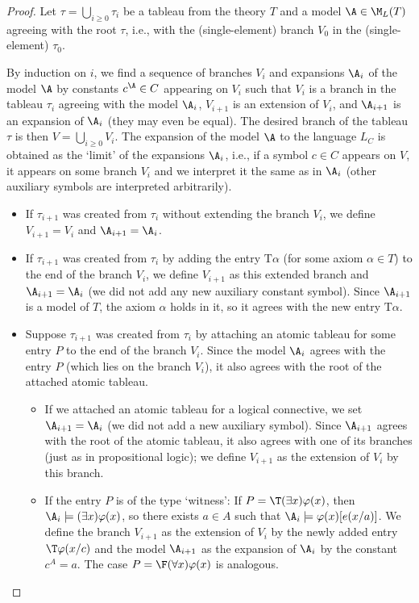 \begin{proof}
    Let $\tau=\bigcup_{i\geq 0}\tau_i$ be a tableau from the theory $T$ and a model $\A\in\M_L(T)$ agreeing with the root $\tau$, i.e., with the (single-element) branch $V_0$ in the (single-element) $\tau_0$.
    
    By induction on $i$, we find a sequence of branches $V_i$ and expansions $\A_i$ of the model $\A$ by constants $c^\A\in C$ appearing on $V_i$ such that $V_i$ is a branch in the tableau $\tau_i$ agreeing with the model $\A_i$, $V_{i+1}$ is an extension of $V_i$, and $\A_{i+1}$ is an expansion of $\A_i$ (they may even be equal). The desired branch of the tableau $\tau$ is then $V=\bigcup_{i\geq 0}V_i$. The expansion of the model $\A$ to the language $L_C$ is obtained as the `limit' of the expansions $\A_i$, i.e., if a symbol $c\in C$ appears on $V$, it appears on some branch $V_i$ and we interpret it the same as in $\A_i$ (other auxiliary symbols are interpreted arbitrarily).
    \begin{itemize}
        \item If $\tau_{i+1}$ was created from $\tau_i$ without extending the branch $V_i$, we define $V_{i+1}=V_i$ and $\A_{i+1}=\A_{i}$.
        \item If $\tau_{i+1}$ was created from $\tau_i$ by adding the entry $\mathrm{T}\alpha$ (for some axiom $\alpha\in T$) to the end of the branch $V_i$, we define $V_{i+1}$ as this extended branch and $\A_{i+1}=\A_i$ (we did not add any new auxiliary constant symbol). Since $\A_{i+1}$ is a model of $T$, the axiom $\alpha$ holds in it, so it agrees with the new entry $\mathrm{T}\alpha$.
        \item Suppose $\tau_{i+1}$ was created from $\tau_i$ by attaching an atomic tableau for some entry $P$ to the end of the branch $V_i$. Since the model $\A_i$ agrees with the entry $P$ (which lies on the branch $V_i$), it also agrees with the root of the attached atomic tableau.
        \begin{itemize}
            \item If we attached an atomic tableau for a logical connective, we set $\A_{i+1}=\A_i$ (we did not add a new auxiliary symbol). Since $\A_{i+1}$ agrees with the root of the atomic tableau, it also agrees with one of its branches (just as in propositional logic); we define $V_{i+1}$ as the extension of $V_i$ by this branch.
            \item If the entry $P$ is of the type `witness': If $P=\T(\exists x)\varphi(x)$, then $\A_i\models(\exists x)\varphi(x)$, so there exists $a\in A$ such that $\A_i\models\varphi(x)[e(x/a)]$. We define the branch $V_{i+1}$ as the extension of $V_i$ by the newly added entry $\T\varphi(x/c)$ and the model $\A_{i+1}$ as the expansion of $\A_i$ by the constant $c^A=a$. The case $P=\F(\forall x)\varphi(x)$ is analogous.

\end{itemize}
\end{itemize}
\end{proof}
